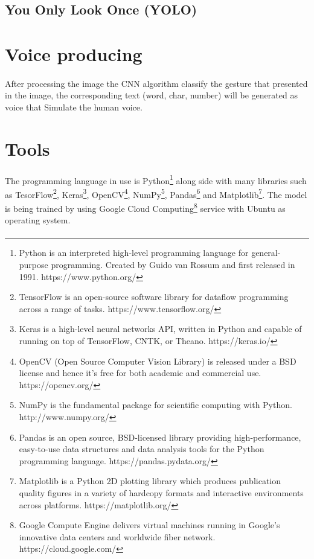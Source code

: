 \documentclass[12pt]{report}
\begin{document}
                \subsection{You Only Look Once (YOLO)}



        \section{Voice producing}
        \paragraph{}
            After processing the image the CNN algorithm classify the gesture
            that presented in the image, the corresponding text (word, char, number)
            will be generated as voice that Simulate the human voice. 
        
        \section{Tools}
        \paragraph{}
            The programming language in use is Python\footnote{Python is an interpreted high-level programming language for general-purpose programming. Created by Guido van Rossum and first released in 1991. https://www.python.org/} along side with many
            libraries such as TesorFlow\footnote{TensorFlow is an open-source software library for dataflow programming across a range of tasks. https://www.tensorflow.org/},
            Keras\footnote{Keras is a high-level neural networks API, written in Python and capable of running on top of TensorFlow, CNTK, or Theano. https://keras.io/}, 
            OpenCV\footnote{OpenCV (Open Source Computer Vision Library) is released under a BSD license and hence it’s free for both academic and commercial use. https://opencv.org/}, 
            NumPy\footnote{NumPy is the fundamental package for scientific computing with Python. http://www.numpy.org/}, 
            Pandas\footnote{Pandas is an open source, BSD-licensed library providing high-performance, easy-to-use data structures and data analysis tools for the Python programming language. https://pandas.pydata.org/}
            and Matplotlib\footnote{Matplotlib is a Python 2D plotting library which produces publication quality figures in a variety of hardcopy formats and interactive environments across platforms. https://matplotlib.org/}.
            The model is being trained by using Google Cloud Computing\footnote{Google Compute Engine delivers virtual machines running in Google's innovative data centers and worldwide fiber network. https://cloud.google.com/} service with Ubuntu as operating system.
        
        \paragraph{}

        
    
\end{document}
